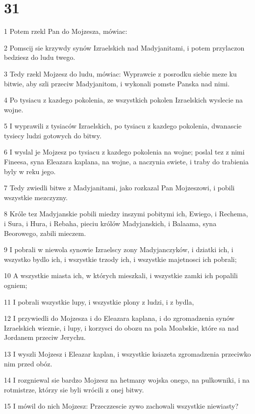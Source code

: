 \chapter{31}

\par 1 Potem rzekl Pan do Mojzesza, mówiac:
\par 2 Pomscij sie krzywdy synów Izraelskich nad Madyjanitami, i potem przylaczon bedziesz do ludu twego.
\par 3 Tedy rzekl Mojzesz do ludu, mówiac: Wyprawcie z posrodku siebie meze ku bitwie, aby szli przeciw Madyjanitom, i wykonali pomste Panska nad nimi.
\par 4 Po tysiacu z kazdego pokolenia, ze wszystkich pokolen Izraelskich wyslecie na wojne.
\par 5 I wyprawili z tysiaców Izraelskich, po tysiacu z kazdego pokolenia, dwanascie tysiecy ludzi gotowych do bitwy.
\par 6 I wyslal je Mojzesz po tysiacu z kazdego pokolenia na wojne; poslal tez z nimi Fineesa, syna Eleazara kaplana, na wojne, a naczynia swiete, i traby do trabienia byly w reku jego.
\par 7 Tedy zwiedli bitwe z Madyjanitami, jako rozkazal Pan Mojzeszowi, i pobili wszystkie mezczyzny.
\par 8 Króle tez Madyjanskie pobili miedzy inszymi pobitymi ich, Ewiego, i Rechema, i Sura, i Hura, i Rebaha, pieciu królów Madyjanskich, i Balaama, syna Beorowego, zabili mieczem.
\par 9 I pobrali w niewola synowie Izraelscy zony Madyjanczyków, i dziatki ich, i wszystko bydlo ich, i wszystkie trzody ich, i wszystkie majetnosci ich pobrali;
\par 10 A wszystkie miasta ich, w których mieszkali, i wszystkie zamki ich popalili ogniem;
\par 11 I pobrali wszystkie lupy, i wszystkie plony z ludzi, i z bydla,
\par 12 I przywiedli do Mojzesza i do Eleazara kaplana, i do zgromadzenia synów Izraelskich wieznie, i lupy, i korzysci do obozu na pola Moabskie, które sa nad Jordanem przeciw Jerychu.
\par 13 I wyszli Mojzesz i Eleazar kaplan, i wszystkie ksiazeta zgromadzenia przeciwko nim przed obóz.
\par 14 I rozgniewal sie bardzo Mojzesz na hetmany wojska onego, na pulkowniki, i na rotmistrze, którzy sie byli wrócili z onej bitwy.
\par 15 I mówil do nich Mojzesz: Przeczzescie zywo zachowali wszystkie niewiasty?
